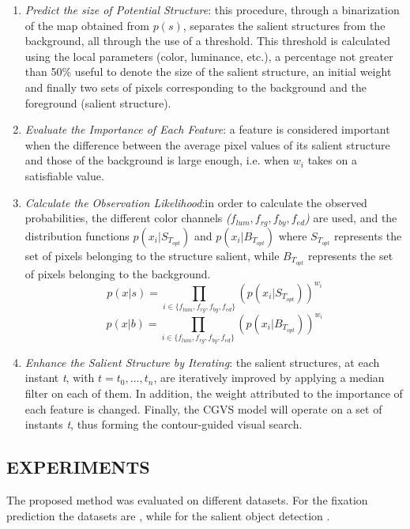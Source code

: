 \begin{enumerate}
    \item \emph{Predict the size of Potential Structure}: this procedure, through a binarization of the map obtained 
    from $ p(s) $, separates the salient structures from the background, all 
    through the use of a threshold. This threshold is calculated using the 
    local parameters (color, luminance, etc.), a percentage not greater than 
    50\% useful to denote the size of the salient structure, an initial weight 
    and finally two sets of pixels corresponding to the background and the 
    foreground (salient structure).
    \item \emph{Evaluate the Importance of Each Feature}: a feature is considered important 
    when the difference between the average pixel values of its 
    salient structure and those of the background is large enough, i.e. when \emph{$ w_i $} 
    takes on a satisfiable value.
    \item \emph{Calculate the Observation Likelihood}:in order to calculate the observed 
    probabilities, the different color channels \emph{($ f_{lum}, f_{rg}, f_{by}, f_{ed} $)} are used, 
    and the distribution functions $ p(x_i | S_{T_{opt}}) $ and $ p(x_i | B_{T_{opt}}) $ where $ S_{T_{opt}} $ 
    represents the set of pixels belonging to the structure salient, while 
    $ B_{T_{opt}} $ represents the set of pixels belonging to the background.
    $$ p(x|s) = \prod_{i \in {\{} f_{lum}, f_{rg}, f_{by}, f_{ed} {\}}} {(p(x_i | S_{T_{opt}}))^{w_i}} $$
    $$ p(x|b) = \prod_{i \in {\{} f_{lum}, f_{rg}, f_{by}, f_{ed} {\}}} {(p(x_i | B_{T_{opt}}))^{w_i}} $$
    \item \emph{Enhance the Salient Structure by Iterating}: the salient structures, at 
    each instant \emph{t}, with $ t = t_0,…, t_n $, are iteratively improved by applying 
    a median filter on each of them. In addition, the weight attributed to 
    the importance of each feature is changed. Finally, the CGVS model 
    will operate on a set of instants \emph{t}, thus forming the contour-guided 
    visual search.
\end{enumerate}

\subsection{EXPERIMENTS}
The proposed method was evaluated on different datasets. For the fixation 
prediction the datasets are \cite{0747815530} \cite{0747815531} \cite{0747815579}, while for the salient object detection \cite{0747815506} \cite{0747815508} \cite{0747815518}.

